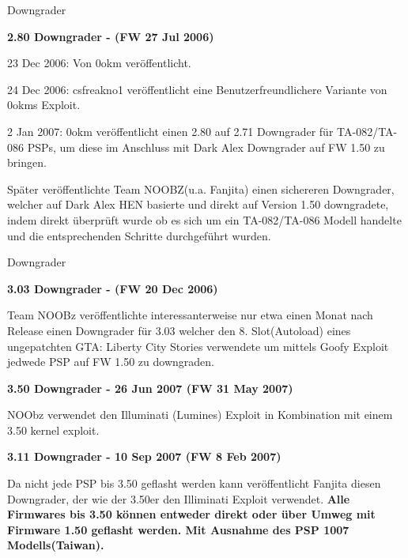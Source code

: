 \documentclass[mode=print,paper=screen,style=jefka]{powerdot}
\begin{document}
\begin{slide}{Downgrader}
	\begin{large}\textbf{2.80 Downgrader - (FW 27 Jul 2006)}\end{large}
	\begin{list}{-}{}
		\item{23 Dec 2006: Von 0okm veröffentlicht. }
		\item{24 Dec 2006: csfreakno1 veröffentlicht eine Benutzerfreundlichere Variante von 0okms Exploit.}
		\item{2 Jan 2007: 0okm veröffentlicht einen 2.80 auf 2.71 Downgrader für TA-082/TA-086 PSPs, um diese im Anschluss mit
			Dark Alex Downgrader auf FW 1.50 zu bringen.}
		\item{Später veröffentlichte Team NOOBZ(u.a. Fanjita) einen sichereren Downgrader, welcher auf Dark Alex HEN basierte
			und direkt auf Version 1.50 downgradete, indem direkt überprüft wurde ob es sich um ein TA-082/TA-086 Modell
			handelte und die entsprechenden Schritte durchgeführt wurden.}
	\end{list}
\end{slide}

\begin{slide}{Downgrader}
	\begin{large}\textbf{3.03 Downgrader - (FW 20 Dec 2006)}\end{large}\linebreak
	Team NOOBz veröffentlichte interessanterweise nur etwa einen Monat nach Release einen Downgrader für 3.03 welcher den 8.
	Slot(Autoload) eines ungepatchten GTA: Liberty City Stories verwendete um mittels Goofy Exploit jedwede PSP auf FW 1.50
	zu downgraden.\linebreak
	\linebreak
	\begin{large}\textbf{3.50 Downgrader - 26 Jun 2007 (FW 31 May 2007)}\end{large}\linebreak
	NOObz verwendet den Illuminati (Lumines) Exploit in Kombination mit einem 3.50 kernel exploit.\linebreak
	\linebreak
	\begin{large}\textbf{3.11 Downgrader - 10 Sep 2007 (FW 8 Feb 2007)}\end{large}\linebreak
	Da nicht jede PSP bis 3.50 geflasht werden kann veröffentlicht Fanjita diesen Downgrader, der wie der 3.50er den Illiminati
	Exploit verwendet.\linebreak
	\linebreak
	\textbf{Alle Firmwares bis 3.50 können entweder direkt oder über Umweg mit Firmware 1.50 geflasht werden. Mit Ausnahme
	des PSP 1007 Modells(Taiwan).} 
\end{slide}
\end{document}
